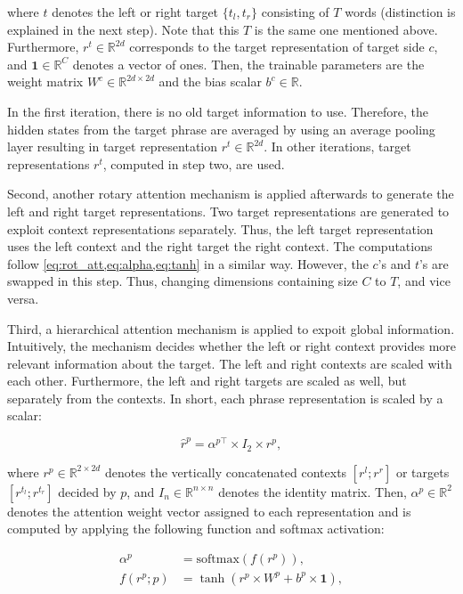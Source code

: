 \documentclass[american, oneside]{ecsgdp}
\begin{document}
\noindent where $t$ denotes the left or right target $\{t_l, t_r\}$ consisting of $T$ words (distinction is explained in the next step). Note that this $T$ is the same one mentioned above. Furthermore, $r^t \in \mathbb{R}^{2d}$ corresponds to the target representation of target side $c$, and $\mathbf{1} \in \mathbb{R}^{C}$ denotes a vector of ones. Then, the trainable parameters are the weight matrix $W^c \in \mathbb{R}^{2d \times 2d}$ and the bias scalar $b^c \in \mathbb{R}$.

In the first iteration, there is no old target information to use. Therefore, the hidden states from the target phrase are averaged by using an average pooling layer resulting in target representation $r^t \in \mathbb{R}^{2d}$. In other iterations, target representations $r^t$, computed in step two, are used.

Second, another rotary attention mechanism is applied afterwards to generate the left and right target representations. Two target representations are generated to exploit context representations separately. Thus, the left target representation uses the left context and the right target the right context. The computations follow \cref{eq:rot_att,eq:alpha,eq:tanh} in a similar way. However, the $c$'s and $t$'s are swapped in this step. Thus, changing dimensions containing size $C$ to $T$, and vice versa.

Third, a hierarchical attention mechanism is applied to expoit global information. Intuitively, the mechanism decides whether the left or right context provides more relevant information about the target. The left and right contexts are scaled with each other. Furthermore, the left and right targets are scaled as well, but separately from the contexts. In short, each phrase representation is scaled by a scalar:

\begin{equation}
    \hat{r}^p = \alpha^{p\top} \times I_2 \times  r^p , \label{eq:hier_att}
\end{equation}

\noindent where $r^p \in \mathbb{R}^{2 \times 2d}$ denotes the vertically concatenated contexts $[r^l; r^r]$ or targets $[r^{t_l}; r^{t_r}]$ decided by $p$, and $I_n \in \mathbb{R}^{n \times n}$ denotes the identity matrix. Then, $\alpha^p \in \mathbb{R}^2$ denotes the attention weight vector assigned to each representation and is computed by applying the following function and softmax activation:

\begin{align}
    \alpha^p                         & = \text{softmax}\left( f \left( r^p\right) \right), \label{eq:hier_alpha}\\
    f \left( r^p; p \right) & = \tanh{\left( r^{p} \times W^p + b^p \times \mathbf{1} \right)}, \label{eq:hier_tanh}
\end{align}
\end{document}
